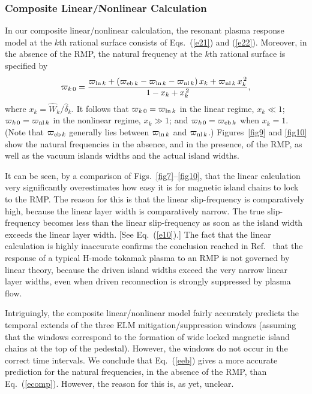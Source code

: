 \documentclass[12pt,prb,aps]{revtex4-1}
\begin{document}
\subsubsection{Composite Linear/Nonlinear Calculation}
In our composite linear/nonlinear calculation, the resonant plasma response model at the $k$th rational surface consists of Eqs.~(\ref{e21}) and (\ref{e22}).
Moreover, in the absence of the RMP, the natural frequency at the $k$th rational surface is specified
by 
\begin{equation}\label{ecomp}
\varpi_{k\,0} = \frac{\varpi_{{\rm ln}\,k} +(\varpi_{{\rm eb}\,k} -\varpi_{{\rm ln}\,k}-\varpi_{{\rm nl}\,k})\,x_k + \varpi_{{\rm nl}\,k}\,x_k^{\,2}}{1-x_k +x_k^{\,2}},
\end{equation}
where $x_k = \hat{W}_k/\hat{\delta}_k$. It follows that $\varpi_{k\,0}=\varpi_{{\rm ln}\,k}$ in the linear regime, $x_k\ll 1$;  $\varpi_{k\,0}=\varpi_{{\rm nl}\,k}$ in the nonlinear regime, $x_k\gg 1$; 
and $\varpi_{k\,0}=\varpi_{{\rm eb}\,k}$  when $x_k=1$. (Note that $\varpi_{{\rm eb}\,k}$ generally lies between $\varpi_{{\rm ln}\,k}$ and $\varpi_{{\rm nl}\,k}$.) Figures~\ref{fig9} and \ref{fig10} show the natural frequencies in the absence, and in the presence, of the RMP, as well as the vacuum
islands widths and the actual island widths. 

It can be seen, by a comparison of Figs.~\ref{fig7}--\ref{fig10}, that the linear calculation very significantly overestimates how easy it is for magnetic
island chains to lock to the RMP. The reason for this is that the linear slip-frequency is comparatively high, because the linear layer width is
comparatively narrow. The true slip-frequency becomes less than the linear slip-frequency as soon as the island width exceeds the
linear layer width. [See Eq.~(\ref{e10}).] The fact that the linear calculation is highly inaccurate confirms the conclusion reached in Ref.~
that the response of a typical H-mode tokamak plasma to an RMP is not governed by linear theory, because the driven
island widths exceed the very narrow linear layer widths, even when driven reconnection is strongly suppressed by plasma flow. 

Intriguingly, the composite linear/nonlinear model fairly accurately predicts the temporal extends of the three ELM mitigation/suppression windows (assuming that the
windows correspond to the formation of wide locked magnetic island chains at the top of the pedestal). 
However, the windows do not occur in the correct time intervals. We conclude that Eq.~(\ref{eeb}) gives a more accurate prediction for the
natural frequencies, in the absence of the RMP, than Eq.~(\ref{ecomp}). However, the reason for this is, as yet, unclear. 
\end{document}
